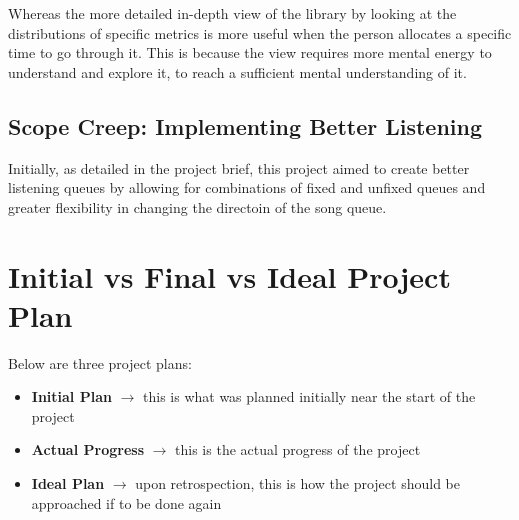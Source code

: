 

Whereas the more detailed in-depth view of the library by looking at the distributions of specific metrics is more useful when the person allocates a specific time to go through it.
This is because the view requires more mental energy to understand and explore it, to reach a sufficient mental understanding of it.

\subsection{Scope Creep: Implementing Better Listening}
Initially, as detailed in the project brief, this project aimed to create better listening queues by allowing for combinations of fixed and unfixed queues and greater flexibility in changing the directoin of the song queue.

\section{Initial vs Final vs Ideal Project Plan}%
Below are three project plans:\begin{itemize}
    \item \textbf{Initial Plan} \(\to\) this is what was planned initially near the start of the project
    \item \textbf{Actual Progress} \(\to\) this is the actual progress of the project
    \item \textbf{Ideal Plan} \(\to\) upon retrospection, this is how the project should be approached if to be done again
\end{itemize}

